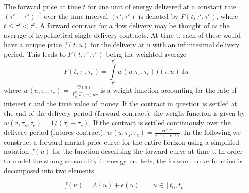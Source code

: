The forward price at time $t$ for one unit of energy delivered at a constant rate $(\tau^e-\tau^s)^{-1}$ over the time interval $(\tau^s,\tau^e)$ is denoted by $F(t,\tau^s,\tau^e)$, where $t\leq\tau^s<\tau^e$.  A forward contract for a flow delivery may be thought of as the average of hypothetical single-delivery contracts. At time t, each of these would have a unique price $f(t,u)$ for the delivery at u with an infinitesimal delivery period. This leads to $F(t,\tau^s,\tau^e)$ being the weighted average 
\begin{equation}
F(t,\tau_s,\tau_e)=\int\limits_{\tau^s}^{\tau^e}{w(u, \tau_s, \tau_e) f(t,u)}\,\mathrm{d}u
\label{fwdprice}
\end{equation}
where $w(u, \tau_s, \tau_e) = \frac{\hat{w}(u)}{\int_{\tau_s}^{\tau_e}\hat{w}(v) dv}$ is a weight function accounting for the rate of interest $r$ and the time value of money. If the contract in question is settled at the end of the delivery period (forward contract), the weight function is given by $w(u, \tau_s, \tau_e) = 1/(\tau_e-\tau_s)$. If the contract is settled continuously over the delivery period (futures contract), $w(u, \tau_s, \tau_e) = \frac{re^{-ru}}{e^{-r\tau_s}-e^{-r\tau_e}}$.  In the following we construct a forward market price curve for the entire horizon using a simplified notation $f(u)$ for the function describing the forward curve at time t. In order to model the strong seasonality in energy markets, the forward curve function is decomposed into two elements:

\begin{equation}
f(u)=\Lambda(u) + \epsilon(u) \qquad {u \in [t_0,t_n] }
\end{equation}


